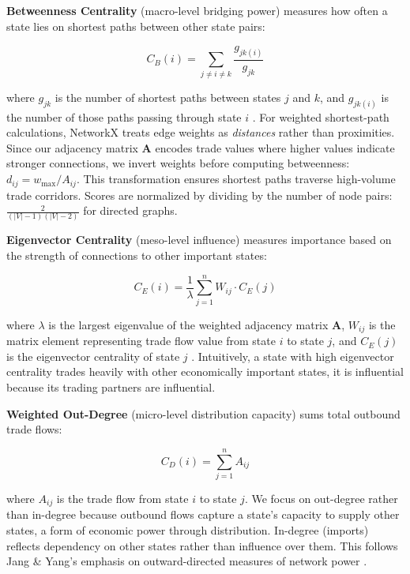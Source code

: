 \documentclass[12pt,oneside]{book}
\begin{document}
\textbf{Betweenness Centrality} (macro-level bridging power) measures how often a state lies on shortest paths between other state pairs:

\begin{equation}
C_{B}(i)=\sum_{j \neq i \neq k} \frac{g_{jk(i)}}{g_{jk}}
\end{equation}

where $g_{jk}$ is the number of shortest paths between states $j$ and $k$, and $g_{jk(i)}$ is the number of those paths passing through state $i$ \cite{jang_measuring_2023}. For weighted shortest-path calculations, NetworkX treats edge weights as \textit{distances} rather than proximities. Since our adjacency matrix $\mathbf{A}$ encodes trade values where higher values indicate stronger connections, we invert weights before computing betweenness: $d_{ij} = w_{\max} / A_{ij}$. This transformation ensures shortest paths traverse high-volume trade corridors. Scores are normalized by dividing by the number of node pairs: $\frac{2}{(|V|-1)(|V|-2)}$ for directed graphs.


\textbf{Eigenvector Centrality} (meso-level influence) measures importance based on the strength of connections to other important states:

\begin{equation}
C_{E}(i)=\frac{1}{\lambda} \sum_{j=1}^{n} W_{i j} \cdot C_E(j)
\end{equation}

where $\lambda$ is the largest eigenvalue of the weighted adjacency matrix $\mathbf{A}$, $W_{ij}$ is the matrix element representing trade flow value from state $i$ to state $j$, and $C_E(j)$ is the eigenvector centrality of state $j$ \cite{jang_measuring_2023}. Intuitively, a state with high eigenvector centrality trades heavily with other economically important states, it is influential because its trading partners are influential. 

\textbf{Weighted Out-Degree} (micro-level distribution capacity) sums total outbound trade flows:

\begin{equation}
C_{D}(i)=\sum_{j=1}^{n} A_{ij}
\end{equation}

where $A_{ij}$ is the trade flow from state $i$ to state $j$. We focus on out-degree rather than in-degree because outbound flows capture a state's capacity to supply other states, a form of economic power through distribution. In-degree (imports) reflects dependency on other states rather than influence over them. This follows Jang \& Yang's emphasis on outward-directed measures of network power \cite{jang_measuring_2023}.
\end{document}
